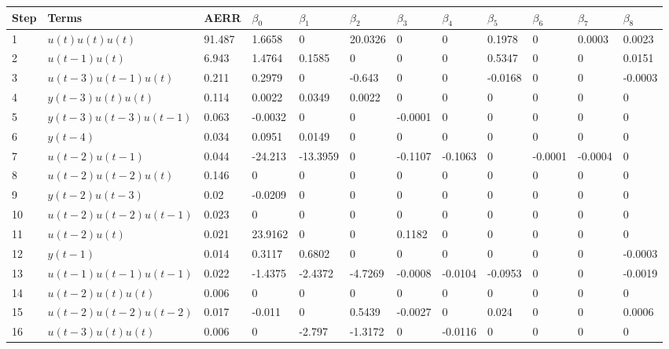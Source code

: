 \begin{tabular}{llllllllllll}
Step & Terms & AERR & $\beta_{0}$ & $\beta_{1}$ & $\beta_{2}$ & $\beta_{3}$ & $\beta_{4}$ & $\beta_{5}$ & $\beta_{6}$ & $\beta_{7}$ & $\beta_{8}$ \\ 
\hline 
1 & $u(t)u(t)u(t)$ & 91.487 & 1.6658 & 0 & 20.0326 & 0 & 0 & 0.1978 & 0 & 0.0003 & 0.0023 \\ 
2 & $u(t-1)u(t)$ & 6.943 & 1.4764 & 0.1585 & 0 & 0 & 0 & 0.5347 & 0 & 0 & 0.0151 \\ 
3 & $u(t-3)u(t-1)u(t)$ & 0.211 & 0.2979 & 0 & -0.643 & 0 & 0 & -0.0168 & 0 & 0 & -0.0003 \\ 
4 & $y(t-3)u(t)u(t)$ & 0.114 & 0.0022 & 0.0349 & 0.0022 & 0 & 0 & 0 & 0 & 0 & 0 \\ 
5 & $y(t-3)u(t-3)u(t-1)$ & 0.063 & -0.0032 & 0 & 0 & -0.0001 & 0 & 0 & 0 & 0 & 0 \\ 
6 & $y(t-4)$ & 0.034 & 0.0951 & 0.0149 & 0 & 0 & 0 & 0 & 0 & 0 & 0 \\ 
7 & $u(t-2)u(t-1)$ & 0.044 & -24.213 & -13.3959 & 0 & -0.1107 & -0.1063 & 0 & -0.0001 & -0.0004 & 0 \\ 
8 & $u(t-2)u(t-2)u(t)$ & 0.146 & 0 & 0 & 0 & 0 & 0 & 0 & 0 & 0 & 0 \\ 
9 & $y(t-2)u(t-3)$ & 0.02 & -0.0209 & 0 & 0 & 0 & 0 & 0 & 0 & 0 & 0 \\ 
10 & $u(t-2)u(t-2)u(t-1)$ & 0.023 & 0 & 0 & 0 & 0 & 0 & 0 & 0 & 0 & 0 \\ 
11 & $u(t-2)u(t)$ & 0.021 & 23.9162 & 0 & 0 & 0.1182 & 0 & 0 & 0 & 0 & 0 \\ 
12 & $y(t-1)$ & 0.014 & 0.3117 & 0.6802 & 0 & 0 & 0 & 0 & 0 & 0 & -0.0003 \\ 
13 & $u(t-1)u(t-1)u(t-1)$ & 0.022 & -1.4375 & -2.4372 & -4.7269 & -0.0008 & -0.0104 & -0.0953 & 0 & 0 & -0.0019 \\ 
14 & $u(t-2)u(t)u(t)$ & 0.006 & 0 & 0 & 0 & 0 & 0 & 0 & 0 & 0 & 0 \\ 
15 & $u(t-2)u(t-2)u(t-2)$ & 0.017 & -0.011 & 0 & 0.5439 & -0.0027 & 0 & 0.024 & 0 & 0 & 0.0006 \\ 
16 & $u(t-3)u(t)u(t)$ & 0.006 & 0 & -2.797 & -1.3172 & 0 & -0.0116 & 0 & 0 & 0 & 0 \\ 
\hline 
\end{tabular}